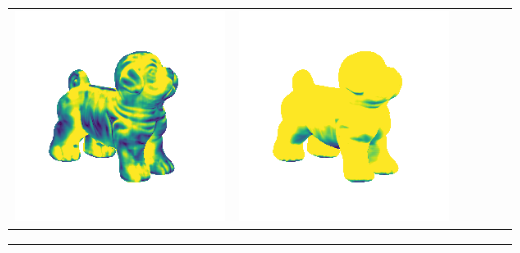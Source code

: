 \begin{center}
\begin{tabularx}{\linewidth}{@{}Y@{}Y@{}Y@{}Y@{}Y@{}Y@{}}
\includegraphics[width=\linewidth]{semisynthetic/20150514_17_marrnet_err.png} &
\includegraphics[width=\linewidth]{semisynthetic/20150514_17_ef_err.png} \\
\end{tabularx}
\begin{center}\rule{0.5\linewidth}{\linethickness}\end{center}


\end{center}
